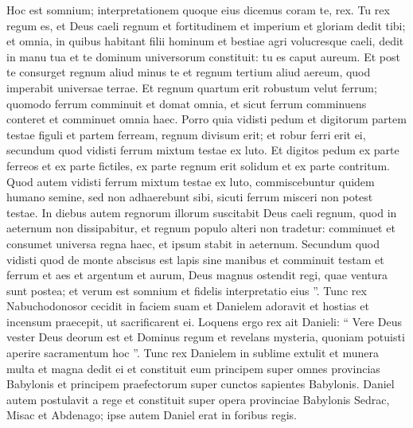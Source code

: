\begin{biblechapter}
\begin{biblechapter}
 \verse Hoc est somnium; interpretationem quoque eius dicemus coram te, rex. 
\verse Tu rex regum es, et Deus caeli regnum et fortitudinem et imperium et gloriam dedit tibi; 
\verse et omnia, in quibus habitant filii hominum et bestiae agri volucresque caeli, dedit in manu tua et te dominum universorum constituit: tu es caput aureum. 
\verse Et post te consurget regnum aliud minus te et regnum tertium aliud aereum, quod imperabit universae terrae. 
\verse Et regnum quartum erit robustum velut ferrum; quomodo ferrum comminuit et domat omnia, et sicut ferrum comminuens conteret et comminuet omnia haec. 
\verse Porro quia vidisti pedum et digitorum partem testae figuli et partem ferream, regnum divisum erit; et robur ferri erit ei, secundum quod vidisti ferrum mixtum testae ex luto. 
 \verse Et digitos pedum ex parte ferreos et ex parte fictiles, ex parte regnum erit solidum et ex parte contritum. 
\verse Quod autem vidisti ferrum mixtum testae ex luto, commiscebuntur quidem humano semine, sed non adhaerebunt sibi, sicuti ferrum misceri non potest testae. 
\verse In diebus autem regnorum illorum suscitabit Deus caeli regnum, quod in aeternum non dissipabitur, et regnum populo alteri non tradetur: comminuet et consumet universa regna haec, et ipsum stabit in aeternum. 
\verse Secundum quod vidisti quod de monte abscisus est lapis sine manibus et comminuit testam et ferrum et aes et argentum et aurum, Deus magnus ostendit regi, quae ventura sunt postea; et verum est somnium et fidelis interpretatio eius ”.
 \verse Tunc rex Nabuchodonosor cecidit in faciem suam et Danielem adoravit et hostias et incensum praecepit, ut sacrificarent ei. 
\verse Loquens ergo rex ait Danieli: “ Vere Deus vester Deus deorum est et Dominus regum et revelans mysteria, quoniam potuisti aperire sacramentum hoc ”. 
\verse Tunc rex Danielem in sublime extulit et munera multa et magna dedit ei et constituit eum principem super omnes provincias Babylonis et principem praefectorum super cunctos sapientes Babylonis. 
\verse Daniel autem postulavit a rege et constituit super opera provinciae Babylonis Sedrac, Misac et Abdenago; ipse autem Daniel erat in foribus regis.
 

\end{biblechapter}
\end{biblechapter}
